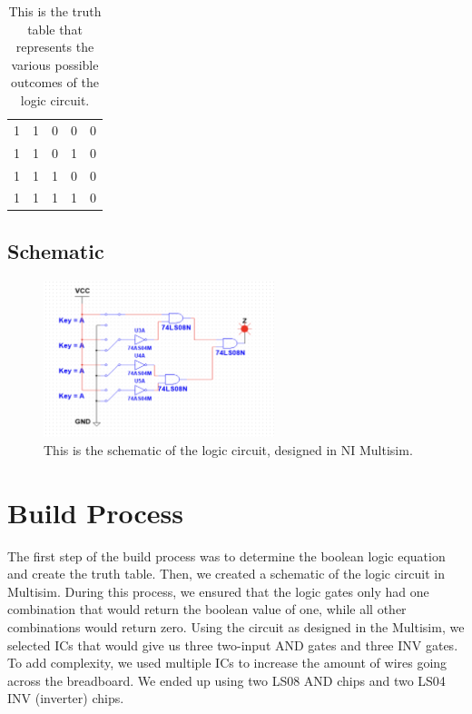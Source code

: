 \documentclass{article}
\begin{document}
\begin{table}[!htb]
\begin{tabular}{c|c|c|c|c}
{\color[HTML]{000000} 1}      & {\color[HTML]{000000} 1}      & {\color[HTML]{000000} 0}      & {\color[HTML]{000000} 0}      & {\color[HTML]{000000} 0} \\
{\color[HTML]{000000} 1}      & {\color[HTML]{000000} 1}      & {\color[HTML]{000000} 0}      & {\color[HTML]{000000} 1}      & {\color[HTML]{000000} 0} \\
{\color[HTML]{000000} 1}      & {\color[HTML]{000000} 1}      & {\color[HTML]{000000} 1}      & {\color[HTML]{000000} 0}      & {\color[HTML]{000000} 0} \\
{\color[HTML]{000000} 1}      & {\color[HTML]{000000} 1}      & {\color[HTML]{000000} 1}      & {\color[HTML]{000000} 1}      & {\color[HTML]{000000} 0}
\end{tabular}
\caption{\label{fig:truth table}This is the truth table that represents the various possible outcomes of the logic circuit.}
\end{table}
\newpage
\subsection{Schematic}

\begin{figure}[!htb]
\centering
\includegraphics[width=0.6\textwidth]{schematic.png}
\caption{\label{fig:schematic}This is the schematic of the logic circuit, designed in NI Multisim.}
\end{figure}

\section{Build Process}

The first step of the build process was to determine the boolean logic equation and create the truth table. Then, we created a schematic of the logic circuit in Multisim. During this process, we ensured that the logic gates only had one combination that would return the boolean value of one, while all other combinations would return zero. Using the circuit as designed in the Multisim, we selected ICs that would give us three two-input AND gates and three INV gates. To add complexity, we used multiple ICs to increase the amount of wires going across the breadboard. We ended up using two LS08 AND chips and two LS04 INV (inverter) chips.
	
\end{document}
